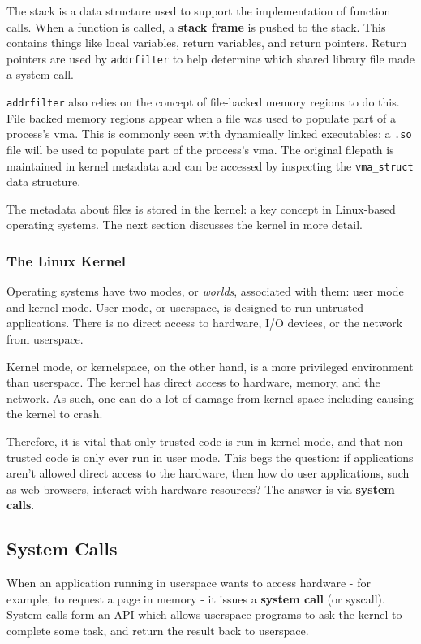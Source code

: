 The stack is a data structure used to support the implementation of function
calls. When a function is called, a \textbf{stack frame} is pushed to the
stack. This contains things like local variables, return variables, and
return pointers. Return pointers are used by \texttt{addrfilter} to help
determine which shared library file made a system call.

\texttt{addrfilter} also relies on the concept of file-backed memory regions 
to do this. File backed memory regions appear when a file was used to populate
part of a process's \ac{vma}. This is commonly seen with dynamically linked
executables: a \texttt{.so} file will be used to populate part of the
process's \ac{vma}. The original filepath is maintained in kernel metadata and
can be accessed by inspecting the \texttt{vma\_struct} data structure.

The metadata about files is stored in the kernel: a key concept in Linux-based
operating systems. The next section discusses the kernel in more detail.

\subsubsection{The Linux Kernel}
Operating systems have two modes, or \textit{worlds}, associated with them: user
mode and kernel mode. User mode, or userspace, is designed to run untrusted 
applications. There is no direct access to hardware, I/O devices, or the 
network from userspace.

Kernel mode, or kernelspace, on the other hand, is a more privileged environment
than userspace. The kernel has direct access to hardware, memory, and the
network. As such, one can do a lot of damage from kernel space including causing
the kernel to crash.

Therefore, it is vital that only trusted code is run in kernel mode, and that
non-trusted code is only ever run in user mode. This begs the question: if
applications aren't allowed direct access to the hardware, then how do user
applications, such as web browsers, interact with hardware resources? The answer
is via \textbf{system calls}.

\subsection{System Calls}

When an application running in userspace wants to access hardware - for example,
to request a page in memory - it issues a \textbf{system call} (or syscall). System calls
form an \ac{API} which allows userspace programs to ask the kernel to complete some
task, and return the result back to userspace.

